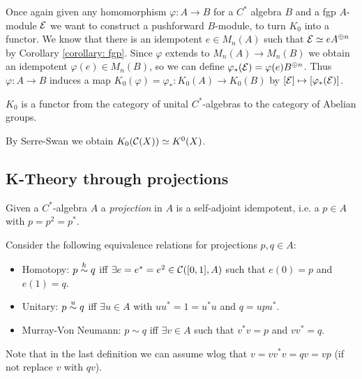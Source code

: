 \noindent Once again given any homomorphism $\varphi\colon A\to B$ for a $C^\ast$ algebra $B$ and a fgp $A$-module $\mathcal{E}$ we want to construct a pushforward $B$-module, to turn $K_0$ into a functor. We know that there is an idempotent $e\in M_n(A)$ such that $\mathcal{E}\simeq eA^{\oplus n}$ by Corollary \eqref{corollary: fgp}. Since $\varphi$ extends to $M_n(A)\to M_n(B)$ we obtain an idempotent $\varphi(e)\in M_n(B)$, so we can define $\varphi_\ast(\mathcal{E})=\varphi(e)B^{\oplus n}$. Thus $\varphi\colon A\to B$ induces a map $K_0(\varphi)=\varphi_\ast\colon K_0(A)\to K_0(B)$ by $[\mathcal{E}]\mapsto[\varphi_\ast(\mathcal{E})]$.

\begin{fact}
 $K_0$ is a functor from the category of unital $C^\ast$-algebras to the category of Abelian groups.
\end{fact}

\begin{lemma}
 By Serre-Swan we obtain $K_0(\mathcal{C}(X))\simeq K^0(X)$.
\end{lemma}

\subsection{K-Theory through projections}
\begin{definition}
 Given a $C^\ast$-algebra $A$ a \emph{projection} in $A$ is a self-adjoint idempotent, i.e. a $p\in A$ with $p=p^2=p^\ast$.
\end{definition}

\begin{definition}
 Consider the following equivalence relations for projections $p,q\in A$:
 \begin{itemize}
  \item Homotopy: $p\stackrel{h}{\sim} q$ iff $\exists e=e^\ast=e^2\in\mathcal{C}([0,1],A)$ such that $e(0)=p$ and $e(1)=q$.
  \item Unitary: $p\stackrel{u}{\sim} q$ iff $\exists u\in A$ with $uu^\ast=1=u^\ast u$ and $q=upu^\ast$.
  \item Murray-Von Neumann: $p\sim q$ iff $\exists v\in A$ such that $v^\ast v=p$ and $vv^\ast=q$.
 \end{itemize}
 Note that in the last definition we can assume wlog that $v=vv^\ast v=qv=vp$ (if not replace $v$ with $qv$).
\end{definition}

